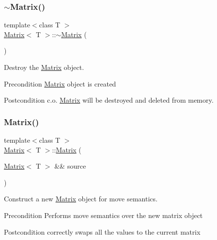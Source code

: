 \subsubsection{\texorpdfstring{$\sim$Matrix()}{~Matrix()}}
{\footnotesize\ttfamily template$<$class T $>$ \\
\mbox{\hyperlink{class_matrix}{Matrix}}$<$ T $>$\+::$\sim$\mbox{\hyperlink{class_matrix}{Matrix}} (\begin{DoxyParamCaption}{ }\end{DoxyParamCaption})}



Destroy the \mbox{\hyperlink{class_matrix}{Matrix}} object. 

\begin{DoxyPrecond}{Precondition}
\mbox{\hyperlink{class_matrix}{Matrix}} object is created 
\end{DoxyPrecond}
\begin{DoxyPostcond}{Postcondition}
c.\+o. \mbox{\hyperlink{class_matrix}{Matrix}} will be destroyed and deleted from memory. 
\end{DoxyPostcond}
\mbox{\label{class_matrix_a0632d6b00522f3ce31684c07cb258440}} 
\subsubsection{\texorpdfstring{Matrix()}{Matrix()}\hspace{0.1cm}{\footnotesize\ttfamily [4/4]}}
{\footnotesize\ttfamily template$<$class T $>$ \\
\mbox{\hyperlink{class_matrix}{Matrix}}$<$ T $>$\+::\mbox{\hyperlink{class_matrix}{Matrix}} (\begin{DoxyParamCaption}\item[{\mbox{\hyperlink{class_matrix}{Matrix}}$<$ T $>$ \&\&}]{source }\end{DoxyParamCaption})}



Construct a new \mbox{\hyperlink{class_matrix}{Matrix}} object for move semantics. 

\begin{DoxyPrecond}{Precondition}
Performs move semantics over the new matrix object 
\end{DoxyPrecond}
\begin{DoxyPostcond}{Postcondition}
correctly swaps all the values to the current matrix 
\end{DoxyPostcond}

